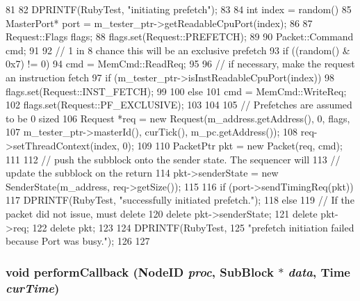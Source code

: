 \begin{DoxyCode}
81 {
82     DPRINTF(RubyTest, "initiating prefetch\n");
83 
84     int index = random() %
85     MasterPort* port = m_tester_ptr->getReadableCpuPort(index);
86 
87     Request::Flags flags;
88     flags.set(Request::PREFETCH);
89 
90     Packet::Command cmd;
91 
92     // 1 in 8 chance this will be an exclusive prefetch
93     if ((random() & 0x7) != 0) {
94         cmd = MemCmd::ReadReq;
95 
96         // if necessary, make the request an instruction fetch
97         if (m_tester_ptr->isInstReadableCpuPort(index)) {
98             flags.set(Request::INST_FETCH);
99         }
100     } else {
101         cmd = MemCmd::WriteReq;
102         flags.set(Request::PF_EXCLUSIVE);
103     }
104 
105     // Prefetches are assumed to be 0 sized
106     Request *req = new Request(m_address.getAddress(), 0, flags,
107             m_tester_ptr->masterId(), curTick(), m_pc.getAddress());
108     req->setThreadContext(index, 0);
109 
110     PacketPtr pkt = new Packet(req, cmd);
111 
112     // push the subblock onto the sender state.  The sequencer will
113     // update the subblock on the return
114     pkt->senderState = new SenderState(m_address, req->getSize());
115 
116     if (port->sendTimingReq(pkt)) {
117         DPRINTF(RubyTest, "successfully initiated prefetch.\n");
118     } else {
119         // If the packet did not issue, must delete
120         delete pkt->senderState;
121         delete pkt->req;
122         delete pkt;
123 
124         DPRINTF(RubyTest,
125                 "prefetch initiation failed because Port was busy.\n");
126     }
127 }
\end{DoxyCode}
\hypertarget{classCheck_aafaa6880b81bad24ff0ee650caf91bfc}{
\subsubsection[{performCallback}]{\setlength{\rightskip}{0pt plus 5cm}void performCallback ({\bf NodeID} {\em proc}, \/  {\bf SubBlock} $\ast$ {\em data}, \/  {\bf Time} {\em curTime})}}
\label{classCheck_aafaa6880b81bad24ff0ee650caf91bfc}



